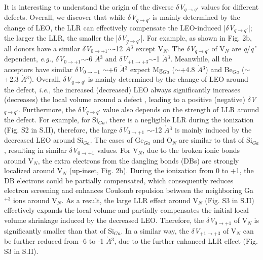 \documentclass[onecolumn,preprint,superscriptaddress]{revtex4-1}
\begin{document}
It is interesting to understand the origin of the diverse $\delta$\emph{V}$_{q\rightarrow q'}$ values for different defects. Overall, we discover that while $\delta$\emph{V}$_{q\rightarrow q'}$ is mainly determined by the change of LEO, the LLR can effectively compensate the LEO-induced |$\delta$\emph{V}$_{q\rightarrow q'}$|; the larger the LLR, the smaller the |$\delta$\emph{V}$_{q\rightarrow q'}$|. For example, as shown in Fig. 2b, all donors have a similar $\delta$\emph{V}$_{0\rightarrow +1}$$\sim$-12 $\mathring{A}$$^3$ except V$_N$. The $\delta$\emph{V}$_{q\rightarrow q'}$ of V$_N$ are \emph{q}/\emph{q'} dependent, \emph{e.g.}, $\delta$\emph{V}$_{0\rightarrow +1}$$\sim$-6 $\mathring{A}$$^3$ and $\delta$\emph{V}$_{+1\rightarrow +3}$$\sim$-1 $\mathring{A}$$^3$. Meanwhile, all the acceptors have similar $\delta$\emph{V}$_{0\rightarrow -1}$ $\sim$+6 $\mathring{A}$$^3$ expect Mg$_{Ga}$ ($\sim$+4.8 $\mathring{A}$$^3$) and Be$_{Ga}$ ($\sim$+2.3 $\mathring{A}$$^3$). Overall, $\delta$\emph{V}$_{q\rightarrow q'}$ is mainly determined by the change of LEO around the defect, \emph{i.e.}, the increased (decreased) LEO always significantly increases (decreases) the local volume around a defect \cite{45}, leading to a positive (negative) $\delta$\emph{V}$_{q\rightarrow q'}$. Furthermore, the $\delta$\emph{V}$_{q\rightarrow q'}$ value also depends on the strength of LLR around the defect. For example, for Si$_{Ga}$, there is a negligible LLR during the ionization (Fig. S2 in S.II), therefore, the large $\delta$\emph{V}$_{0\rightarrow +1}$ $\sim$-12 $\mathring{A}$$^3$ is mainly induced by the decreased LEO around Si$_{Ga}$. The cases of Ge$_{Ga}$ and O$_{N}$ are similar to that of Si$_{Ga}$, resulting in similar $\delta$\emph{V}$_{0\rightarrow +1}$ values. For V$_N$, due to the broken ionic bonds around V$_N$, the extra electrons from the dangling bonds (DBs) are strongly localized around V$_N$ (up-inset, Fig. 2b). During the ionization from 0 to +1, the DB electrons could be partially compensated, which consequently reduces electron screening and enhances Coulomb repulsion between the neighboring Ga$^{+3}$ ions around V$_N$. As a result, the large LLR effect around V$_N$ (Fig. S3 in S.II) effectively expands the local volume and partially compensates the initial local volume shrinkage induced by the decreased LEO. Therefore, the $\delta$\emph{V}$_{0\rightarrow +1}$ of V$_N$ is significantly smaller than that of Si$_{Ga}$. In a similar way, the $\delta$\emph{V}$_{+1\rightarrow +3}$ of V$_N$ can be further reduced from -6 to -1 $\mathring{A}$$^3$, due to the further enhanced LLR effect (Fig. S3 in S.II).
\end{document}
